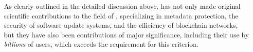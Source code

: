 As clearly outlined in the detailed discussion above, \dr has not only made
original scientific contributions to the field of \dpcs, specializing in
metadata protection, the security of software-update systems, and the efficiency
of blockchain networks, but they have also been contributions of major
significance, including their use by \textit{billions} of users, which exceeds
the requirement for this criterion.
